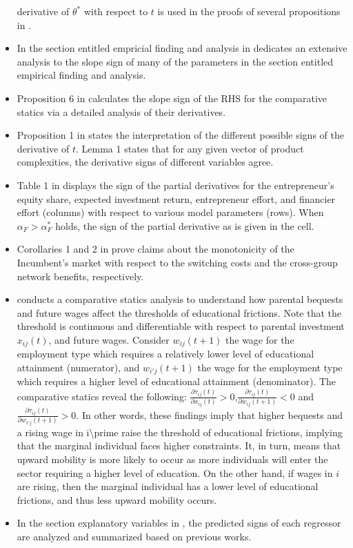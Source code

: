 \documentclass[11pt]{book}
\begin{document}
\begin{itemize}
derivative of $\theta^{*}$ with respect to $t$ is used in the proofs
of several propositions in \cite{gabszewicz2018random}.
\item In the section entitled empricial finding and analysis in \cite{kejlberg2018effects}
dedicates an extensive analysis to the slope sign of many of the parameters
in the section entitled empirical finding and analysis.
\item Proposition 6 in \cite{siemroth2019informational}
calculates the slope sign of the RHS for the comparative statics via
a detailed analysis of their derivatives.
\item Proposition 1 in \cite{oehmke2019tragedy} states the
interpretation of the different possible signs of the derivative of
$t$. Lemma 1 states that for any given vector of product complexities,
the derivative signs of different variables agree.
\item Table 1 in \cite{pandher2019financier}
displays the sign of the partial derivatives for the entrepreneur's
equity share, expected investment return, entrepreneur effort, and
financier effort (columns) with respect to various model parameters
(rows). When $\alpha_{F}>\alpha_{F}^{*}$ holds, the sign of the partial
derivative as is given in the cell.
\item Corollaries 1 and 2 in \cite{siciliani2019platform}
prove claims about the monotonicity of the Incumbent's market with
respect to the switching costs and the cross-group network benefits,
respectively.
\item \cite{hennig2021labor}
conducts a comparative statics analysis to understand how parental
bequests and future wages affect the thresholds of educational frictions.
Note that the threshold is continuous and differentiable with respect
to parental investment $x_{ij}\left(t\right)$, and future wages.
Consider $w_{ij}\left(t+1\right)$ the wage for the employment type
which requires a relatively lower level of educational attainment
(numerator), and $w_{i'j}\left(t+1\right)$ the wage for the employment
type which requires a higher level of educational attainment (denominator).
The comparative statics reveal the following: $\frac{\partial\tau_{ij}\left(t\right)}{\partial x_{ij}\left(t\right)}>0$,$\frac{\partial\tau_{ij}\left(t\right)}{\partial w_{ij}\left(t+1\right)}<0$
and $\frac{\partial\tau_{ij}\left(t\right)}{\partial w_{i'j}\left(t+1\right)}>0$.
In other words, these findings imply that higher bequests and a rising
wage in i\textbackslash prime raise the threshold of educational
frictions, implying that the marginal individual faces higher constraints.
It, in turn, means that upward mobility is more likely to occur as
more individuals will enter the sector requiring a higher level of
education. On the other hand, if wages in $i$ are rising, then the
marginal individual has a lower level of educational frictions, and
thus less upward mobility occurs.
\item In the section \textquotedbl explanatory variables\textquotedbl{}
in \cite{bulfone2021corporate},
the predicted signs of each regressor are analyzed and summarized
based on previous works.
\end{itemize}
\end{document}
